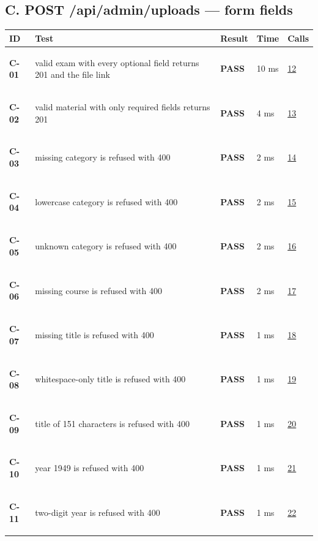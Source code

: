 \documentclass[10pt,a4paper]{article}
\begin{document}
\subsection*{C. POST /api/admin/uploads — form fields}
\begin{longtable}{@{}P{1.2cm}P{9.2cm}P{1.2cm}P{1.3cm}P{2.4cm}@{}}
\toprule \textbf{ID} & \textbf{Test} & \textbf{Result} & \textbf{Time} & \textbf{Calls} \\ \midrule \endhead
\hypertarget{test-C-01}{\textbf{C-01}} & valid exam with every optional field returns 201 and the file link & \textcolor{passgreen}{\textbf{PASS}} & 10 ms & \hyperlink{call12}{12} \\
\hypertarget{test-C-02}{\textbf{C-02}} & valid material with only required fields returns 201 & \textcolor{passgreen}{\textbf{PASS}} & 4 ms & \hyperlink{call13}{13} \\
\hypertarget{test-C-03}{\textbf{C-03}} & missing category is refused with 400 & \textcolor{passgreen}{\textbf{PASS}} & 2 ms & \hyperlink{call14}{14} \\
\hypertarget{test-C-04}{\textbf{C-04}} & lowercase category is refused with 400 & \textcolor{passgreen}{\textbf{PASS}} & 2 ms & \hyperlink{call15}{15} \\
\hypertarget{test-C-05}{\textbf{C-05}} & unknown category is refused with 400 & \textcolor{passgreen}{\textbf{PASS}} & 2 ms & \hyperlink{call16}{16} \\
\hypertarget{test-C-06}{\textbf{C-06}} & missing course is refused with 400 & \textcolor{passgreen}{\textbf{PASS}} & 2 ms & \hyperlink{call17}{17} \\
\hypertarget{test-C-07}{\textbf{C-07}} & missing title is refused with 400 & \textcolor{passgreen}{\textbf{PASS}} & 1 ms & \hyperlink{call18}{18} \\
\hypertarget{test-C-08}{\textbf{C-08}} & whitespace-only title is refused with 400 & \textcolor{passgreen}{\textbf{PASS}} & 1 ms & \hyperlink{call19}{19} \\
\hypertarget{test-C-09}{\textbf{C-09}} & title of 151 characters is refused with 400 & \textcolor{passgreen}{\textbf{PASS}} & 1 ms & \hyperlink{call20}{20} \\
\hypertarget{test-C-10}{\textbf{C-10}} & year 1949 is refused with 400 & \textcolor{passgreen}{\textbf{PASS}} & 1 ms & \hyperlink{call21}{21} \\
\hypertarget{test-C-11}{\textbf{C-11}} & two-digit year is refused with 400 & \textcolor{passgreen}{\textbf{PASS}} & 1 ms & \hyperlink{call22}{22} \\

\end{longtable}
\end{document}
